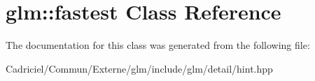 \hypertarget{classglm_1_1fastest}{}\section{glm\+:\+:fastest Class Reference}
\label{classglm_1_1fastest}


The documentation for this class was generated from the following file\+:\begin{DoxyCompactItemize}
\item 
Cadriciel/\+Commun/\+Externe/glm/include/glm/detail/hint.\+hpp\end{DoxyCompactItemize}
